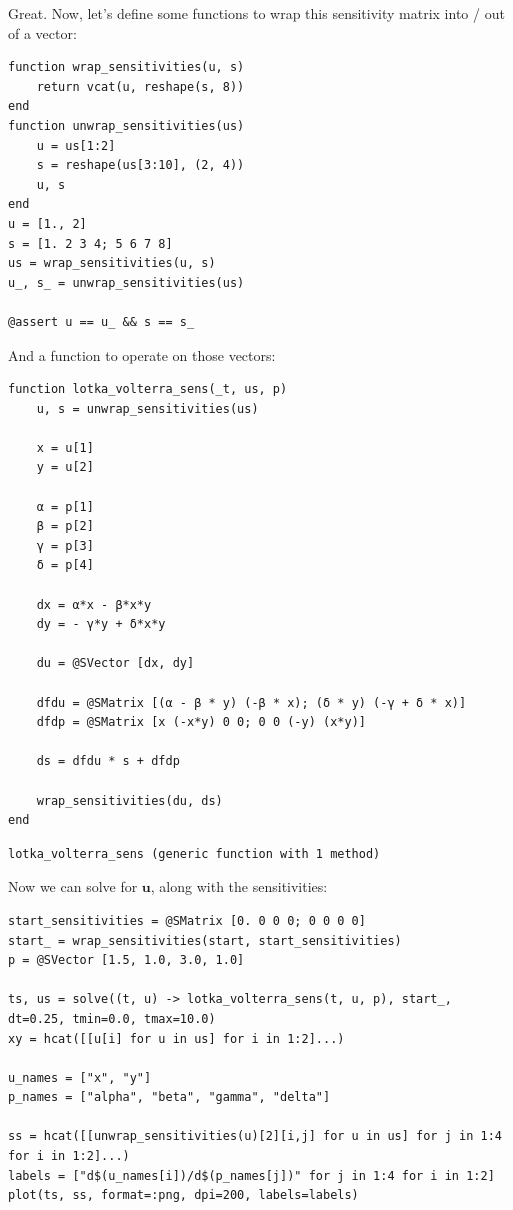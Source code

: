 \documentclass[nobib]{tufte-handout}
\newcommand{\uv}[0]{\mathbf{u}}
\begin{document}
Great. Now, let's define some functions to wrap this sensitivity matrix into / out of a vector:

\begin{verbatim}
function wrap_sensitivities(u, s)
    return vcat(u, reshape(s, 8))
end
function unwrap_sensitivities(us)
    u = us[1:2]
    s = reshape(us[3:10], (2, 4))
    u, s
end
u = [1., 2]
s = [1. 2 3 4; 5 6 7 8]
us = wrap_sensitivities(u, s)
u_, s_ = unwrap_sensitivities(us)

@assert u == u_ && s == s_
\end{verbatim}

And a function to operate on those vectors:

\begin{verbatim}
function lotka_volterra_sens(_t, us, p)
    u, s = unwrap_sensitivities(us)

    x = u[1]
    y = u[2]

    α = p[1]
    β = p[2]
    γ = p[3]
    δ = p[4]

    dx = α*x - β*x*y
    dy = - γ*y + δ*x*y

    du = @SVector [dx, dy]

    dfdu = @SMatrix [(α - β * y) (-β * x); (δ * y) (-γ + δ * x)]
    dfdp = @SMatrix [x (-x*y) 0 0; 0 0 (-y) (x*y)]

    ds = dfdu * s + dfdp

    wrap_sensitivities(du, ds)
end
\end{verbatim}

\begin{verbatim}
lotka_volterra_sens (generic function with 1 method)
\end{verbatim}


Now we can solve for \(\uv\), along with the sensitivities:

\begin{verbatim}
start_sensitivities = @SMatrix [0. 0 0 0; 0 0 0 0]
start_ = wrap_sensitivities(start, start_sensitivities)
p = @SVector [1.5, 1.0, 3.0, 1.0]

ts, us = solve((t, u) -> lotka_volterra_sens(t, u, p), start_, dt=0.25, tmin=0.0, tmax=10.0)
xy = hcat([[u[i] for u in us] for i in 1:2]...)

u_names = ["x", "y"]
p_names = ["alpha", "beta", "gamma", "delta"]

ss = hcat([[unwrap_sensitivities(u)[2][i,j] for u in us] for j in 1:4 for i in 1:2]...)
labels = ["d$(u_names[i])/d$(p_names[j])" for j in 1:4 for i in 1:2]
plot(ts, ss, format=:png, dpi=200, labels=labels)
\end{verbatim}
\end{document}
